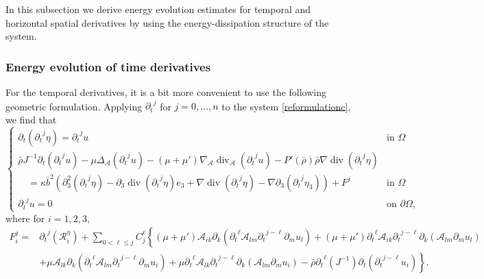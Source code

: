 \documentclass[a4paper,reqno,11pt]{amsart}
\numberwithin{equation}{section}
\begin{document}
In this subsection we derive energy evolution estimates for temporal and horizontal spatial derivatives by using the energy-dissipation structure of the system.

\subsubsection{Energy evolution of time derivatives}\label{stable2}

For the temporal derivatives, it is a bit more convenient to use the following geometric formulation. Applying ${\partial_t}^j$ for $j=0,\dots,n$ to the system \eqref{reformulationc}, we find that
\begin{equation}\label{linear_geometricc}
\begin{cases}
  {\partial_t} ({\partial_t}^j \eta) ={\partial_t}^j u  & \text{in } \Omega
\\  \bar \rho J^{-1}{\partial_t} ({\partial_t}^j u) -\mu\Delta_{\mathcal{A}}  ({\partial_t}^j u)-(\mu+\mu')\nabla_{\mathcal{A}} \operatorname{div}_{\mathcal{A}}  ({\partial_t}^j u)-P '(\bar{\rho} )\bar\rho \nabla \operatorname{div} ({\partial_t}^j \eta)
 &\\\quad=\kappa\bar b^2\left( {\partial}_3^2({\partial_t}^j \eta)- {\partial}_3\operatorname{div} ({\partial_t}^j \eta) e_3+\nabla\operatorname{div} ({\partial_t}^j \eta)- \nabla{\partial}_3({\partial_t}^j \eta_3)\right)+ F^{j}  & \text{in }
\Omega \\
{\partial_t}^j u  =0 & \text{on } {\partial}\Omega,
\end{cases}
\end{equation}
where for $i=1,2,3,$
\begin{equation}\label{F_def_startc}
\begin{split}
 F_i^{j}  = &{\partial_t}^j(\mathcal{R}_i^\eta)+\sum_{0 < \ell \le j}  C_j^\ell\left\{ (\mu+\mu')
\mathcal{A}_{ik} {\partial}_k ( {\partial_t}^\ell  \mathcal{A}_{lm} {\partial_t}^{j-\ell}{\partial}_m u_l)
   +   (\mu+\mu'){\partial_t}^\ell \mathcal{A}_{ik}{\partial_t}^{j-\ell}{\partial}_k ( \mathcal{A}_{lm}{\partial}_m u_l) \right.
   \\&  \left.+  \mu\mathcal{A}_{lk} {\partial}_k ( {\partial_t}^\ell  \mathcal{A}_{lm} {\partial_t}^{j-\ell}{\partial}_m u_i)
   +   \mu{\partial_t}^\ell \mathcal{A}_{lk}{\partial_t}^{j-\ell}{\partial}_k ( \mathcal{A}_{lm}{\partial}_m u_i) -\bar \rho {\partial_t}^\ell(J^{-1}){\partial_t} ({\partial_t}^{j-\ell} u_i)\right\}.
 \end{split}
\end{equation}
\end{document}
